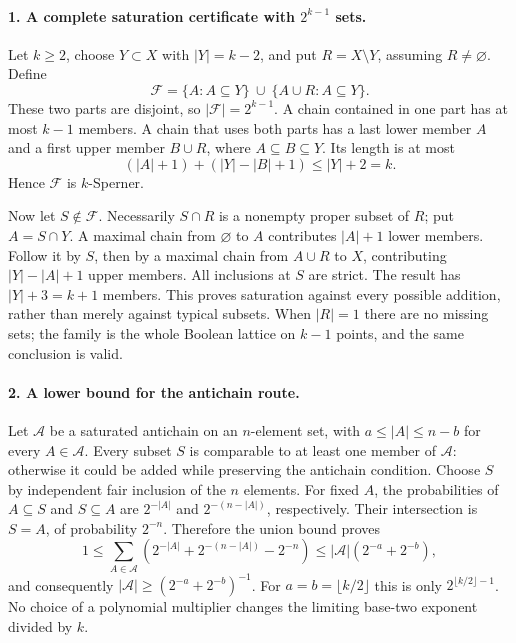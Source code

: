 \documentclass[11pt,a4paper]{article}
\begin{document}
\paragraph{1. A complete saturation certificate with $2^{k-1}$ sets.}
Let $k\ge2$, choose $Y\subset X$ with $|Y|=k-2$, and put
$R=X\setminus Y$, assuming $R\ne\varnothing$. Define
\[
 \mathcal F=\{A:A\subseteq Y\}\ \cup\
 \{A\cup R:A\subseteq Y\}.
\]
These two parts are disjoint, so $|\mathcal F|=2^{k-1}$.
A chain contained in one part has at most $k-1$ members. A chain
that uses both parts has a last lower member $A$ and a first upper
member $B\cup R$, where $A\subseteq B\subseteq Y$. Its length is at most
\[
 (|A|+1)+(|Y|-|B|+1)\le |Y|+2=k.
\]
Hence $\mathcal F$ is $k$-Sperner.

Now let $S\notin\mathcal F$. Necessarily $S\cap R$ is a nonempty
proper subset of $R$; put $A=S\cap Y$. A maximal chain from
$\varnothing$ to $A$ contributes $|A|+1$ lower members. Follow it
by $S$, then by a maximal chain from $A\cup R$ to $X$, contributing
$|Y|-|A|+1$ upper members. All inclusions at $S$ are strict. The
result has $|Y|+3=k+1$ members. This proves saturation against
every possible addition, rather than merely against typical subsets.
When $|R|=1$ there are no missing sets; the family is the whole
Boolean lattice on $k-1$ points, and the same conclusion is valid.

\paragraph{2. A lower bound for the antichain route.}
Let $\mathcal A$ be a saturated antichain on an $n$-element set,
with $a\le|A|\le n-b$ for every $A\in\mathcal A$. Every subset
$S$ is comparable to at least one member of $\mathcal A$: otherwise
it could be added while preserving the antichain condition.
Choose $S$ by independent fair inclusion of the $n$ elements. For
fixed $A$, the probabilities of $A\subseteq S$ and $S\subseteq A$
are $2^{-|A|}$ and $2^{-(n-|A|)}$, respectively. Their intersection
is $S=A$, of probability $2^{-n}$. Therefore the union bound proves
\[
 1\le\sum_{A\in\mathcal A}
 \left(2^{-|A|}+2^{-(n-|A|)}-2^{-n}\right)
 \le|\mathcal A|(2^{-a}+2^{-b}),
\]
and consequently $|\mathcal A|\ge(2^{-a}+2^{-b})^{-1}$.
For $a=b=\lfloor k/2\rfloor$ this is only
$2^{\lfloor k/2\rfloor-1}$. No choice of a polynomial multiplier
changes the limiting base-two exponent divided by $k$.
\end{document}
